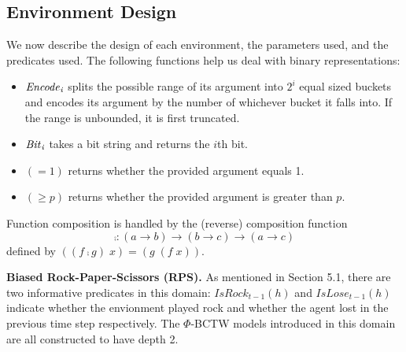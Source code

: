 \subsection{Environment Design}
We now describe the design of each environment, the parameters used, and the predicates used.
The following functions help us deal with binary representations:
\begin{itemize}
    \item $\it{Encode}_i$ splits the possible range of its argument into $2^i$ equal sized buckets and encodes its argument by the number of whichever bucket it falls into. If the range is unbounded, it is first truncated. 
    \item $\it{Bit}_i$ takes a bit string and returns the $i$th bit. 
    \item $(= 1)$ returns whether the provided argument equals 1.
    \item $(\geq p)$ returns whether the provided argument is greater than $p$.
\end{itemize}

Function composition is handled by the (reverse)
composition function 
\[ \comp : (a \rightarrow b) \rightarrow (b \rightarrow c) \rightarrow 
             (a \rightarrow c) \]
defined by
$ ((f \comp g) \; x) = (g \; (f \; x)).$

\textbf{Biased Rock-Paper-Scissors (RPS).} 
As mentioned in Section 5.1, there are two informative predicates in this domain: $IsRock_{t-1}(h)$ and $IsLose_{t-1}(h)$ indicate whether the envionment played rock and whether the agent lost in the previous time step respectively. The $\Phi$-BCTW models introduced in this domain are all constructed to have depth 2. 


